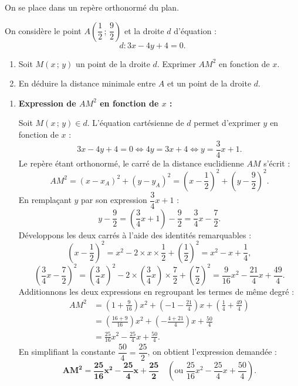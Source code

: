 \documentclass[11pt,a4paper]{article}
\begin{document}
On se place dans un repère orthonormé du plan.

On considère le point $A\left(\dfrac{1}{2}\,;\, \dfrac{9}{2}\right)$ et la droite $d$ d'équation :
\[
d : 3x - 4y + 4 = 0.
\]

\begin{enumerate}
    \item Soit $M(x\,;\,y)$ un point de la droite $d$. Exprimer $AM^2$ en fonction de $x$.
    \item En déduire la distance minimale entre $A$ et un point de la droite $d$.
\end{enumerate}

\begin{correctionbox}
\begin{enumerate}
    \item \textbf{Expression de $AM^2$ en fonction de $x$ :}
    
    Soit $M(x\,;\,y) \in d$. L'équation cartésienne de $d$ permet d'exprimer $y$ en fonction de $x$ :
    \[
    3x - 4y + 4 = 0 \iff 4y = 3x + 4 \iff y = \frac{3}{4}x + 1.
    \]
    Le repère étant orthonormé, le carré de la distance euclidienne $AM$ s'écrit :
    \[
    AM^2 = (x - x_A)^2 + (y - y_A)^2 = \left(x - \frac{1}{2}\right)^2 + \left(y - \frac{9}{2}\right)^2.
    \]
    En remplaçant $y$ par son expression $\dfrac{3}{4}x + 1$ :
    \[
    y - \frac{9}{2} = \left(\frac{3}{4}x + 1\right) - \frac{9}{2} = \frac{3}{4}x - \frac{7}{2}.
    \]
    Développons les deux carrés à l'aide des identités remarquables :
    \[
    \left(x - \frac{1}{2}\right)^2 = x^2 - 2 \times x \times \frac{1}{2} + \left(\frac{1}{2}\right)^2 = x^2 - x + \frac{1}{4},
    \]
    \[
    \left(\frac{3}{4}x - \frac{7}{2}\right)^2 = \left(\frac{3}{4}x\right)^2 - 2 \times \left(\frac{3}{4}x\right) \times \frac{7}{2} + \left(\frac{7}{2}\right)^2 = \frac{9}{16}x^2 - \frac{21}{4}x + \frac{49}{4}.
    \]
    Additionnons les deux expressions en regroupant les termes de même degré :
    \begin{align*}
    AM^2 &= \left(1 + \frac{9}{16}\right)x^2 + \left(-1 - \frac{21}{4}\right)x + \left(\frac{1}{4} + \frac{49}{4}\right) \\
    &= \left(\frac{16 + 9}{16}\right)x^2 + \left(-\frac{4 + 21}{4}\right)x + \frac{50}{4} \\
    &= \frac{25}{16}x^2 - \frac{25}{4}x + \frac{50}{4}.
    \end{align*}
    En simplifiant la constante $\dfrac{50}{4} = \dfrac{25}{2}$, on obtient l'expression demandée :
    \[
    \mathbf{AM^2 = \frac{25}{16}x^2 - \frac{25}{4}x + \frac{25}{2}} \quad \left(\text{ou } \frac{25}{16}x^2 - \frac{25}{4}x + \frac{50}{4}\right).
    \]


\end{enumerate}
\end{correctionbox}
\end{document}
